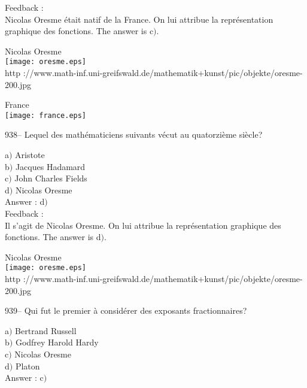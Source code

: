 \documentclass[letterpaper, 12pt]{article}
\begin{document}
Feedback : \\
Nicolas Oresme \'etait natif de la France. On lui attribue la
repr\'esentation graphique des fonctions. The answer is c$)$.\\

        \begin{center}
        Nicolas Oresme\\
    \texttt{[image: oresme.eps]}\\
        {\footnotesize http
://www.math-inf.uni-greifswald.de/mathematik+kunst/pic/objekte/oresme-200.jpg}
    \end{center}

        \begin{center}
        France\\
    \texttt{[image: france.eps]}\\
    \end{center}

938-- Lequel des math\'ematiciens suivants v\'ecut au quatorzi\`eme
si\`ecle?

a$)$ Aristote \\
b$)$ Jacques Hadamard \\
c$)$ John Charles Fields \\
d$)$ Nicolas Oresme\\

Answer : d$)$\\

Feedback :\\
Il s'agit de Nicolas Oresme. On lui attribue la repr\'esentation graphique
des fonctions. The answer is d$)$.\\

        \begin{center}
        Nicolas Oresme\\
    \texttt{[image: oresme.eps]}\\
        {\footnotesize http
://www.math-inf.uni-greifswald.de/mathematik+kunst/pic/objekte/oresme-200.jpg}
    \end{center}

939-- Qui fut le premier \`a consid\'erer des exposants
fractionnaires?

a$)$ Bertrand Russell \\
b$)$ Godfrey Harold Hardy \\
c$)$ Nicolas Oresme \\
d$)$ Platon\\

Answer : c$)$\\
\end{document}
